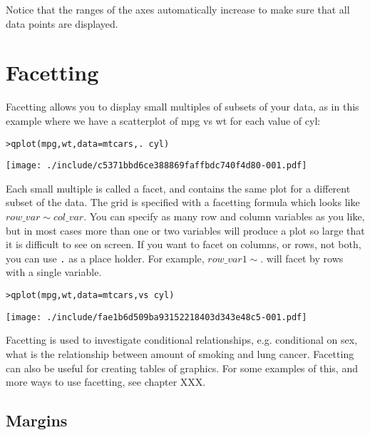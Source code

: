 Notice that the ranges of the axes automatically increase to make sure that all data points are displayed.

\section{Facetting}\label{sec:facetting}

Facetting allows you to display small multiples of subsets of your data, as in this example where we have a scatterplot of mpg vs wt for each value of cyl:

\begin{alltt}
> qplot(mpg, wt, data = mtcars, . ~ cyl)
\end{alltt}
\texttt{[image: ./include/c5371bbd6ce388869faffbdc740f4d80-001.pdf]}
\begin{alltt}

\end{alltt}%

Each small multiple is called a facet, and contains the same plot for a different subset of the data.  The grid is specified with a facetting formula which looks like $row\_var \sim col\_var $.  You can specify as many row and column variables as you like, but in most cases more than one or two variables will produce a plot so large that it is difficult to see on screen.  If you want to facet on columns, or rows, not both, you can use {\tt .} as a place holder.  For example, $row\_var1 \sim .$ will facet by rows with a single variable.  

\begin{alltt}
> qplot(mpg, wt, data = mtcars, vs ~ cyl)
\end{alltt}
\texttt{[image: ./include/fae1b6d509ba93152218403d343e48c5-001.pdf]}
\begin{alltt}

\end{alltt}%

Facetting is used to investigate conditional relationships, e.g. conditional on sex, what is the relationship between amount of smoking and lung cancer.  Facetting can also be useful for creating tables of graphics.  For some examples of this, and more ways to use facetting, see chapter XXX.

\subsection{Margins}\label{sub:margins}


